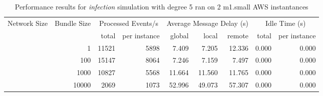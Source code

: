 \begin{table}
	  \caption[Performance results, \emph{infection:5 on 2 m1.small instances }]{ Performance results for \emph{ infection } simulation with degree 5 ran on 2 m1.small AWS instantances }
	\begin{tabular}{rrrrrrrrr}
	\hline\noalign{\smallskip}

	Network Size &
	Bundle Size &
	\multicolumn{2}{c}{Processed Events/s} & 
	\multicolumn{3}{c}{Average Message Delay (s)} & 
	\multicolumn{2}{c}{Idle Time (s)}  \\

	 & 
	 & 
	 total & per instance
     & global & local & remote
     & total & per instance\\

			
				\noalign{\smallskip}\hline
				\multirow{ 4 }{*}{ 40000 } &
				
					
					 
					\multirow{ 1 }{*}{ 1 } &
					
						
							    
							     11521  & 5898  
	                           & 7.409 & 7.205 & 12.336
	                           & 0.000 & 0.000  \\
	                
	            
					 &  
					 
					\multirow{ 1 }{*}{ 100 } &
					
						
							    
							     15147  & 8064  
	                           & 7.246 & 7.159 & 7.497
	                           & 0.000 & 0.000  \\
	                
	            
					 &  
					 
					\multirow{ 1 }{*}{ 1000 } &
					
						
							    
							     10827  & 5568  
	                           & 11.664 & 11.560 & 11.765
	                           & 0.000 & 0.000  \\
	                
	            
					 &  
					 
					\multirow{ 1 }{*}{ 10000 } &
					
						
							    
							     2069  & 1073  
	                           & 52.996 & 49.073 & 57.307
	                           & 0.000 & 0.000  \\
	                

\end{tabular}
\end{table}
